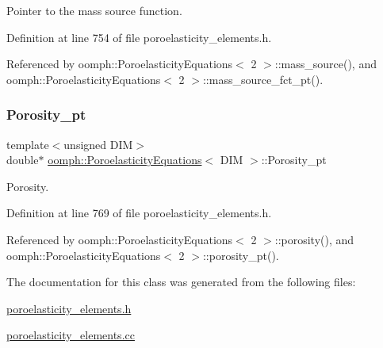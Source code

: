 Pointer to the mass source function. 



Definition at line 754 of file poroelasticity\+\_\+elements.\+h.



Referenced by oomph\+::\+Poroelasticity\+Equations$<$ 2 $>$\+::mass\+\_\+source(), and oomph\+::\+Poroelasticity\+Equations$<$ 2 $>$\+::mass\+\_\+source\+\_\+fct\+\_\+pt().

\mbox{\label{classoomph_1_1PoroelasticityEquations_a247e7383f1a5e52750c6c66ca15f45ce}} 
\subsubsection{\texorpdfstring{Porosity\+\_\+pt}{Porosity\_pt}}
{\footnotesize\ttfamily template$<$unsigned D\+IM$>$ \\
double$\ast$ \hyperlink{classoomph_1_1PoroelasticityEquations}{oomph\+::\+Poroelasticity\+Equations}$<$ D\+IM $>$\+::Porosity\+\_\+pt\hspace{0.3cm}{\ttfamily [private]}}



Porosity. 



Definition at line 769 of file poroelasticity\+\_\+elements.\+h.



Referenced by oomph\+::\+Poroelasticity\+Equations$<$ 2 $>$\+::porosity(), and oomph\+::\+Poroelasticity\+Equations$<$ 2 $>$\+::porosity\+\_\+pt().



The documentation for this class was generated from the following files\+:\begin{DoxyCompactItemize}
\item 
\hyperlink{poroelasticity__elements_8h}{poroelasticity\+\_\+elements.\+h}\item 
\hyperlink{poroelasticity__elements_8cc}{poroelasticity\+\_\+elements.\+cc}\end{DoxyCompactItemize}
